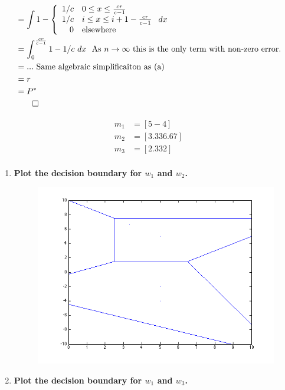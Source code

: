 \documentclass[12pt]{article}
\begin{document}
\begin{enumerate}
\begin{enumerate}
\begin{equation}
\begin{split}
   &= \int 1- \left\{ \begin{array}{rl} 1/c & 0\leq x \leq \frac{cr}{c-1} \\ 1/c & i \leq x \leq i+1-\frac{cr}{c-1} \\ 0 & \text{elsewhere} \end{array} \right. dx \\
   &= \int_0^\frac{cr}{c-1}1-1/c~dx~~\text{As $n \to \infty$ this is the only term with non-zero error.} \\
   &= ...~\text{Same algebraic simplificaiton as (a)} \\
   &=r \\
   &=P^* \\
   & \qed
\end{split}
\end{equation}
\end{enumerate}
\begin{equation}
\begin{split}
m_1 &= [5 -4] \\
m_2 &= [3.33 6.67] \\
m_3 &= [2.33 2] \\
\end{split}
\end{equation}
\newpage
\begin{enumerate}
\item \textbf{Plot the decision boundary for $w_1$ and $w_2$.}
\begin{figure}[H]
\centering
\includegraphics[width=5in]{12.png}
\end{figure}
\item \textbf{Plot the decision boundary for $w_1$ and $w_3$.}

\end{enumerate}
\end{enumerate}
\end{document}

